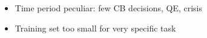 
\begin{itemize}
	\item Time period peculiar: few CB decisions, QE, crisis
	\item Training set too small for very specific task
\end{itemize}